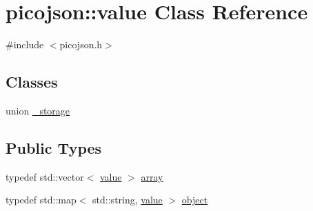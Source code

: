 \hypertarget{classpicojson_1_1value}{}\section{picojson\+:\+:value Class Reference}
\label{classpicojson_1_1value}


{\ttfamily \#include $<$picojson.\+h$>$}

\subsection*{Classes}
\begin{DoxyCompactItemize}
\item 
union \hyperlink{unionpicojson_1_1value_1_1__storage}{\+\_\+storage}
\end{DoxyCompactItemize}
\subsection*{Public Types}
\begin{DoxyCompactItemize}
\item 
typedef std\+::vector$<$ \hyperlink{classpicojson_1_1value}{value} $>$ \hyperlink{classpicojson_1_1value_adeff4fdf7ee5675eeb7686bb89233c43}{array}
\item 
typedef std\+::map$<$ std\+::string, \hyperlink{classpicojson_1_1value}{value} $>$ \hyperlink{classpicojson_1_1value_a7d7da11d54d7b983a902d28367bda9c1}{object}
\end{DoxyCompactItemize}
